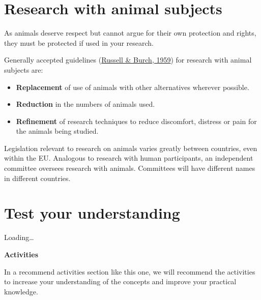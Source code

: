 \documentclass[
]{book}
\begin{document}
\hypertarget{research-with-animal-subjects}{%
\section{Research with animal subjects}\label{research-with-animal-subjects}}

As animals deserve respect but cannot argue for their own protection and rights, they must be protected if used in your research.

Generally accepted guidelines (\href{http://117.239.25.194:7000/jspui/bitstream/123456789/1342/1/PRILIMINERY\%20\%20AND\%20\%20CONTENTS.pdf}{Russell \& Burch, 1959}) for research with animal subjects are:

\begin{itemize}
\item
  \textbf{Replacement} of use of animals with other alternatives wherever possible.
\item
  \textbf{Reduction} in the numbers of animals used.
\item
  \textbf{Refinement} of research techniques to reduce discomfort, distress or pain for the animals being studied.
\end{itemize}

Legislation relevant to research on animals varies greatly between countries, even within the EU. Analogous to research with human participants, an independent committee oversees research with animals. Committees will have different names in different countries.

\hypertarget{test-your-understanding-6}{%
\section{Test your understanding}\label{test-your-understanding-6}}

Loading\ldots{}

\textbf{Activities}

In a recommend activities section like this one, we will recommend the activities to increase your understanding of the concepts and improve your practical knowledge.
\end{document}
